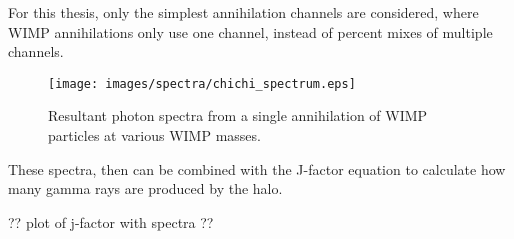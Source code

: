     For this thesis, only the simplest annihilation channels are considered, where WIMP annihilations only use one channel, instead of percent mixes of multiple channels.

    \begin{figure}[ht]
      \begin{center}
        \texttt{[image: images/spectra/chichi\_spectrum.eps]}
        \caption[Single Annihilation Spectra]{Resultant photon spectra from a single annihilation of WIMP particles at various WIMP masses.}\label{fig:chichi_spectrum}
      \end{center}
    \end{figure}

    These spectra, then can be combined with the J-factor equation to calculate how many gamma rays are produced by the halo.

    ?? plot of j-factor with spectra ??


